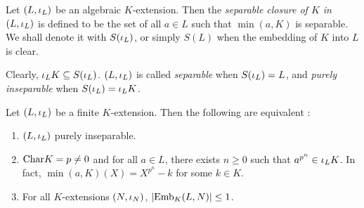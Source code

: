 \documentclass[main.tex]{subfiles}
\begin{document}
\begin{dfn} 
  
  Let $(L,\iota_L)$ be an algebraic $K$-extension. 
  Then the \emph{separable closure of $K$ in $(L,\iota_L)$} is defined to be
  the set of all $a \in L$ such that $\min(a,K)$ is separable. 
  We shall denote it with $S(\iota_L)$,
  or simply $S(L)$ when the embedding of $K$ into $L$ is clear. 

  Clearly, $\iota_L K \subseteq S(\iota_L)$. 
  $(L,\iota_L)$ is called \emph{separable} when $S(\iota_L) = L$,
  and \emph{purely inseparable} when $S(\iota_L) = \iota_L K$. 
\end{dfn}

\begin{thm}  
  
  Let $(L,\iota_L)$ be a finite $K$-extension. 
  Then the following are equivalent : 
  \begin{enumerate}
    \item $(L,\iota_L)$ purely inseparable. 
    \item $\mathrm{Char}K = p \neq 0$ and
    for all $a \in L$, there exists $n \geq 0$ such that
    $a^{p^n} \in \iota_L K$. 
    In fact, $\min(a,K)(X) = X^{p^n} - k$ for some $k \in K$.
    \item For all $K$-extensions $(N,\iota_N)$, $|\mathrm{Emb}_{K}(L, N)| \leq 1$. 
  \end{enumerate}
\end{thm}
\end{document}
